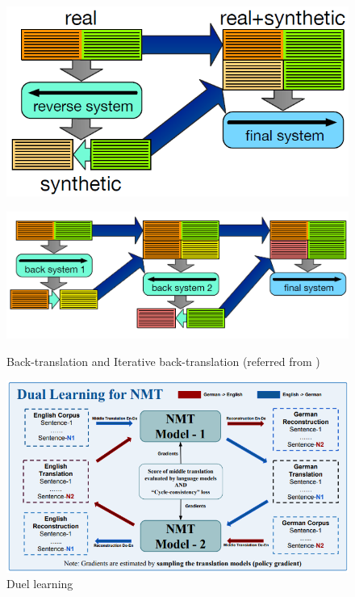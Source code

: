 \documentclass[manuscript,screen]{acmart}
\begin{document}
\begin{figure}[!h]
\begin{minipage}{0.4\textwidth}
         \includegraphics[width=0.8\linewidth]{backTranslationHoang2018.png} 
        \label{back-trans}
\end{minipage}
\begin{minipage}{0.5\textwidth}
\includegraphics[width=0.9\linewidth] {IBT.png}
\label{iter-back-trans}
\end{minipage}
        \caption{Back-translation and Iterative back-translation (referred from \citet{hoang2018iterative})}
        \label{back-trans-and-iter-back-trans}
\end{figure}


\begin{figure}[!h]
    \includegraphics[width=0.9\linewidth]{duelLearningWangZhu.png} 
    \caption{Duel learning}
    \label{duel-learning}
\end{figure}
\end{document}
